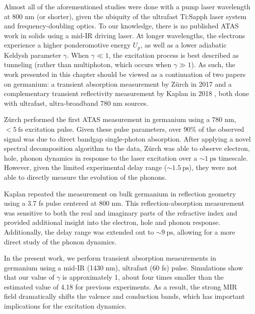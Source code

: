 Almost all of the aforementioned studies were done with a pump laser wavelength at 800 nm (or shorter), given the ubiquity of the ultrafast Ti:Sapph laser system and frequency-doubling optics. To our knowledge, there is no published ATAS work in solids using a mid-IR driving laser. At longer wavelengths, the electrons experience a higher ponderomotive energy $U_p$, as well as a lower adiabatic Keldysh parameter $\gamma$. When $\gamma \ll 1$, the excitation process is best described as tunneling (rather than multiphoton, which occurs when $\gamma \gg 1$). As such, the work presented in this chapter should be viewed as a continuation of two papers on germanium: a transient absorption measurement by Z\"{u}rch in 2017 \cite{zurchDirectSimultaneousObservation2017} and a complementary transient reflectivity measurement by Kaplan in 2018 \cite{kaplanFemtosecondTrackingCarrier2018}, both done with ultrafast, ultra-broadband 780 nm sources.

Z\"{u}rch performed the first ATAS measurement in germanium using a 780 nm, $<5 \ \textrm{fs}$ excitation pulse. Given these pulse parameters, over 90\% of the observed signal was due to direct bandgap single-photon absorption. After applying a novel spectral decomposition algorithm to the data, Z\"{u}rch was able to observe electron, hole, phonon dynamics in response to the laser excitation over a $\sim 1 \ \textrm{ps}$ timescale. However, given the limited experimental delay range ($\sim 1.5 \ \textrm{ps}$), they were not able to directly measure the evolution of the phonons.

Kaplan repeated the measurement on bulk germanium in reflection geometry using a 3.7 fs pulse centered at 800 nm. This reflection-absorption measurement was sensitive to both the real and imaginary parts of the refractive index and provided additional insight into the electron, hole and phonon response. Additionally, the delay range was extended out to $\sim 9 \ \textrm{ps}$, allowing for a more direct study of the phonon dynamics.

In the present work, we perform transient absorption measurements in germanium using a mid-IR (1430 nm), ultrafast (60 fs) pulse. Simulations show that our value of $\gamma$ is approximately 1, about four times smaller than the estimated value of 4.18 for previous experiments. As a result, the strong MIR field dramatically shifts the valence and conduction bands, which has important implications for the excitation dynamics.

